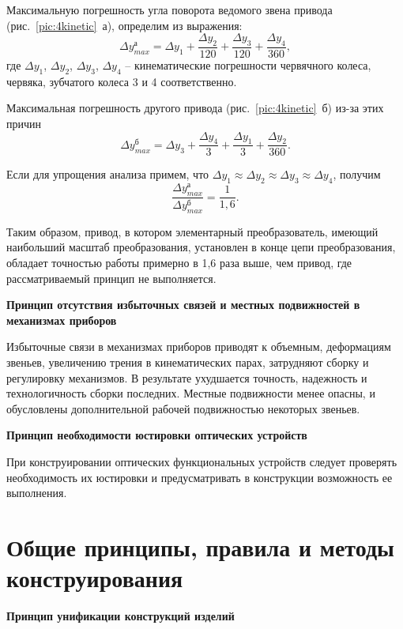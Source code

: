 Максимальную погрешность угла поворота ведомого звена привода (рис.~\ref{pic:4kinetic}~а), определим из выражения:
\[ 
\Delta y_{max}^\text{а} = \Delta y_1 + \dfrac{\Delta y_2}{120}  + \dfrac{\Delta y_3}{120} + \dfrac{\Delta y_4}{360},
\]
где $ \Delta y_1 $, $ \Delta y_2 $, $ \Delta y_3 $, $ \Delta y_4 $ -- кинематические погрешности червячного колеса, червяка, зубчатого колеса 3 и 4 соответственно.

Максимальная погрешность другого привода (рис.~\ref{pic:4kinetic}~б) из-за этих причин
\[ 
\Delta y_{max}^\text{б} = \Delta y_3 + \dfrac{\Delta y_4}{3}  + \dfrac{\Delta y_1}{3} + \dfrac{\Delta y_2}{360}.
\]

Если для упрощения анализа примем, что  $ \Delta y_1 \approx \Delta y_2 \approx \Delta y_3 \approx \Delta y_4 $, получим
\[ 
\dfrac{\Delta y_{max}^\text{а}}{\Delta y_{max}^\text{б}} = \dfrac{1}{1,6}.
\]

Таким образом, привод, в котором элементарный преобразователь, имеющий наибольший масштаб преобразования, установлен в конце цепи преобразования, обладает точностью работы примерно в 1,6 раза выше, чем привод, где рассматриваемый принцип не выполняется.

\begin{flushleft}
\textbf{Принцип отсутствия избыточных связей и местных подвижностей в механизмах приборов}
\end{flushleft}

Избыточные связи в механизмах приборов приводят к объемным, деформациям звеньев, увеличению трения в кинематических парах, затрудняют сборку и регулировку механизмов. В результате ухудшается точность, надежность и технологичность сборки последних. Местные подвижности менее опасны, и обусловлены дополнительной рабочей подвижностью некоторых звеньев.

\begin{flushleft}
\textbf{Принцип необходимости юстировки оптических устройств}
\end{flushleft}

При конструировании оптических функциональных устройств следует проверять необходимость их юстировки и предусматривать в конструкции возможность ее выполнения.

\section{Общие принципы, правила и методы конструирования}

\begin{flushleft}
\textbf{Принцип унификации конструкций изделий}
\end{flushleft}

